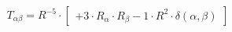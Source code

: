 \begin{subequations}\begin{gather}
T_{\alpha{}\beta{}} = R^{-5} \cdot  \left[ \begin{array}{c} 
 		+ 3 \cdot R_{\alpha{}} \cdot R_{\beta{}}- 1 \cdot R^{2} \cdot \delta{}\left(\alpha{}, \beta{}\right)
 \end{array}\right] 
\end{gather}\end{subequations}